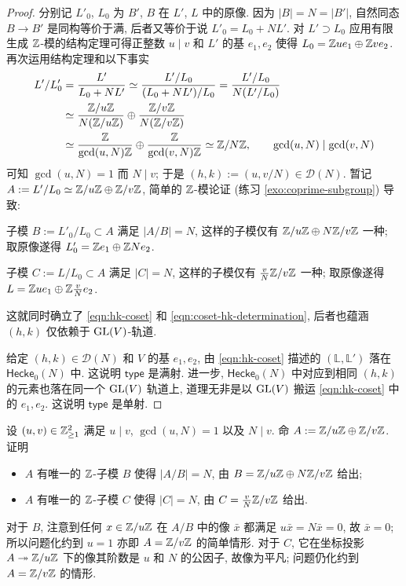 \begin{proof}
	分别记 $L'_0$, $L_0$ 为 $B'$, $B$ 在 $L'$, $L$ 中的原像. 因为 $|B| = N = |B'|$, 自然同态 $B \to B'$ 是同构等价于满, 后者又等价于说 $L'_0 = L_0 + NL'$. 对 $L' \supset L_0$ 应用有限生成 $\mathbb{Z}$-模的结构定理可得正整数 $u \mid v$ 和 $L'$ 的基 $e_1, e_2$ 使得 $L_0 = \mathbb{Z} ue_1 \oplus \mathbb{Z} ve_2$. 再次运用结构定理和以下事实
	\begin{align*}
		L'/L'_0 & = \dfrac{L'}{L_0 + NL'} \simeq \dfrac{L'/L_0}{(L_0 + NL')/L_0} = \dfrac{L'/L_0}{N(L'/L_0)} \\
		& \simeq \dfrac{\mathbb{Z}/u\mathbb{Z}}{N(\mathbb{Z}/u\mathbb{Z})} \oplus \dfrac{\mathbb{Z}/v\mathbb{Z}}{N(\mathbb{Z}/v\mathbb{Z})} \\
		& \simeq \dfrac{\mathbb{Z}}{\gcd(u,N)\mathbb{Z}} \oplus \dfrac{\mathbb{Z}}{\gcd(v,N)\mathbb{Z}} \simeq \mathbb{Z}/N\mathbb{Z}, \qquad \gcd(u,N) \mid \gcd(v,N)
	\end{align*}
	可知 $\gcd(u,N)=1$ 而 $N \mid v$; 于是 $(h,k) := (u, v/N) \in \mathcal{D}(N)$. 暂记 $A := L'/L_0 \simeq \mathbb{Z}/u\mathbb{Z} \oplus \mathbb{Z}/v\mathbb{Z}$, 简单的 $\mathbb{Z}$-模论证 (练习 \ref{exo:coprime-subgroup}) 导致:
	\begin{compactitem}
		\item 子模 $B := L'_0/L_0 \subset A$ 满足 $|A/B| = N$, 这样的子模仅有 $\mathbb{Z}/u\mathbb{Z} \oplus N\mathbb{Z}/v\mathbb{Z}$ 一种; 取原像遂得 $L'_0 = \mathbb{Z} e_1 \oplus \mathbb{Z} Ne_2$.
		\item 子模 $C := L/L_0 \subset A$ 满足 $|C| = N$, 这样的子模仅有 $\frac{v}{N}\mathbb{Z}/v\mathbb{Z}$ 一种; 取原像遂得 $L = \mathbb{Z} ue_1 \oplus \mathbb{Z} \frac{v}{N} e_2$.
	\end{compactitem}
	这就同时确立了 \eqref{eqn:hk-coset} 和 \eqref{eqn:coset-hk-determination}, 后者也蕴涵 $(h,k)$ 仅依赖于 $\operatorname{GL}(V)$-轨道.
	
	给定 $(h,k) \in \mathcal{D}(N)$ 和 $V$ 的基 $e_1, e_2$, 由 \eqref{eqn:hk-coset} 描述的 $(\mathbb{L}, \mathbb{L}')$ 落在 $\mathsf{Hecke}_0(N)$ 中. 这说明 $\mathsf{type}$ 是满射. 进一步, $\mathsf{Hecke}_0(N)$ 中对应到相同 $(h,k)$ 的元素也落在同一个 $\operatorname{GL}(V)$ 轨道上, 道理无非是以 $\operatorname{GL}(V)$ 搬运 \eqref{eqn:hk-coset} 中的 $e_1, e_2$. 这说明 $\mathsf{type}$ 是单射.
\end{proof}

\begin{exercise}\label{exo:coprime-subgroup}
	设 $(u,v) \in \mathbb{Z}^2_{\geq 1}$ 满足 $u \mid v$, $\gcd(u, N) = 1$ 以及 $N \mid v$. 命 $A := \mathbb{Z}/u\mathbb{Z} \oplus \mathbb{Z}/v\mathbb{Z}$. 证明
	\begin{itemize}
		\item $A$ 有唯一的 $\mathbb{Z}$-子模 $B$ 使得 $|A/B| = N$, 由 $B = \mathbb{Z}/u\mathbb{Z} \oplus N\mathbb{Z}/v\mathbb{Z}$ 给出;
		\item $A$ 有唯一的 $\mathbb{Z}$-子模 $C$ 使得 $|C| = N$, 由 $C = \frac{v}{N}\mathbb{Z}/v\mathbb{Z}$ 给出.
	\end{itemize}
	\begin{hint}
		对于 $B$, 注意到任何 $x \in \mathbb{Z}/u\mathbb{Z}$ 在 $A/B$ 中的像 $\bar{x}$ 都满足 $u\bar{x} = N\bar{x} = 0$, 故 $\bar{x} = 0$; 所以问题化约到 $u = 1$ 亦即 $A = \mathbb{Z}/v\mathbb{Z}$ 的简单情形. 对于 $C$, 它在坐标投影 $A \twoheadrightarrow \mathbb{Z}/u\mathbb{Z}$ 下的像其阶数是 $u$ 和 $N$ 的公因子, 故像为平凡; 问题仍化约到 $A = \mathbb{Z}/v\mathbb{Z}$ 的情形.
	\end{hint}
\end{exercise}

